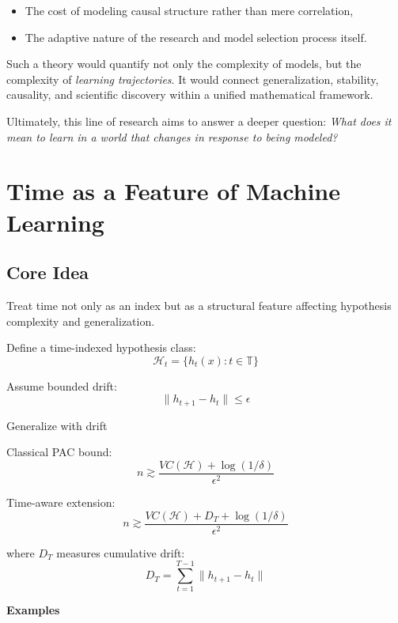 \begin{itemize}
\begin{itemize}
        \item The cost of modeling causal structure rather than mere correlation,

        \item The adaptive nature of the research and model selection process
          itself.
      \end{itemize}

      Such a theory would quantify not only the complexity of models, but
      the complexity of \emph{learning trajectories}. It would connect generalization,
      stability, causality, and scientific discovery within a unified
      mathematical framework.

      Ultimately, this line of research aims to answer a deeper question:
      \emph{What does it mean to learn in a world that changes in
      response to being modeled?}
  \end{itemize}

  \section{Time as a Feature of Machine Learning}

  \subsection*{Core Idea}

  Treat time not only as an index but as a structural feature affecting hypothesis
  complexity and generalization.

  Define a time-indexed hypothesis class:
  \[
    \mathcal{H}_{t}= \{h_{t}(x) : t \in \mathbb{T}\}
  \]

  Assume bounded drift:
  \[
    \|h_{t+1}- h_{t}\| \le \epsilon
  \]

  Generalize with drift

  Classical PAC bound:
  \[
    n \gtrsim \frac{VC(\mathcal{H}) + \log(1/\delta)}{\epsilon^{2}}
  \]

  Time-aware extension:
  \[
    n \gtrsim \frac{VC(\mathcal{H}) + D_{T}+ \log(1/\delta)}{\epsilon^{2}}
  \]

  where $D_{T}$ measures cumulative drift:
  \[
    D_{T}= \sum_{t=1}^{T-1}\|h_{t+1}- h_{t}\|
  \]

  \textbf{Examples}

